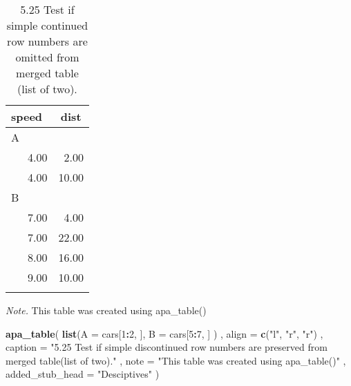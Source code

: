\documentclass[man]{apa6}
\newenvironment{Shaded}{\begin{snugshade}}{\end{snugshade}}
\newcommand{\KeywordTok}[1]{\textcolor[rgb]{0.13,0.29,0.53}{\textbf{#1}}}
\newcommand{\DataTypeTok}[1]{\textcolor[rgb]{0.13,0.29,0.53}{#1}}
\newcommand{\DecValTok}[1]{\textcolor[rgb]{0.00,0.00,0.81}{#1}}
\newcommand{\StringTok}[1]{\textcolor[rgb]{0.31,0.60,0.02}{#1}}
\newcommand{\OperatorTok}[1]{\textcolor[rgb]{0.81,0.36,0.00}{\textbf{#1}}}
\newcommand{\NormalTok}[1]{#1}
\begin{document}
\begin{table}[tbp]
\begin{center}
\begin{threeparttable}
\caption{\label{tab:unnamed-chunk-5}5.25 Test if simple continued row numbers are omitted from merged table (list of two).}
\begin{tabular}{lr}
\toprule
speed & \multicolumn{1}{c}{dist}\\
\midrule
A & \\
\ \ \ 4.00 & 2.00\\
\ \ \ 4.00 & 10.00\\
B & \\
\ \ \ 7.00 & 4.00\\
\ \ \ 7.00 & 22.00\\
\ \ \ 8.00 & 16.00\\
\ \ \ 9.00 & 10.00\\
\bottomrule
\addlinespace
\end{tabular}
\begin{tablenotes}[para]
\normalsize{\textit{Note.} This table was created using apa\_table()}
\end{tablenotes}
\end{threeparttable}
\end{center}
\end{table}

\begin{Shaded}
\begin{Highlighting}[]
\KeywordTok{apa_table}\NormalTok{(}
  \KeywordTok{list}\NormalTok{(}\DataTypeTok{A =}\NormalTok{ cars[}\DecValTok{1}\OperatorTok{:}\DecValTok{2}\NormalTok{, ], }\DataTypeTok{B =}\NormalTok{ cars[}\DecValTok{5}\OperatorTok{:}\DecValTok{7}\NormalTok{, ]}
\NormalTok{      )}
\NormalTok{  , }\DataTypeTok{align =} \KeywordTok{c}\NormalTok{(}\StringTok{"l"}\NormalTok{, }\StringTok{"r"}\NormalTok{, }\StringTok{"r"}\NormalTok{)}
\NormalTok{  , }\DataTypeTok{caption =} \StringTok{"5.25 Test if simple discontinued row numbers are preserved from merged table(list of two)."}
\NormalTok{  , }\DataTypeTok{note =} \StringTok{"This table was created using apa_table()"}
\NormalTok{  , }\DataTypeTok{added_stub_head =} \StringTok{"Desciptives"}
\NormalTok{)}
\end{Highlighting}
\end{Shaded}
\end{document}
